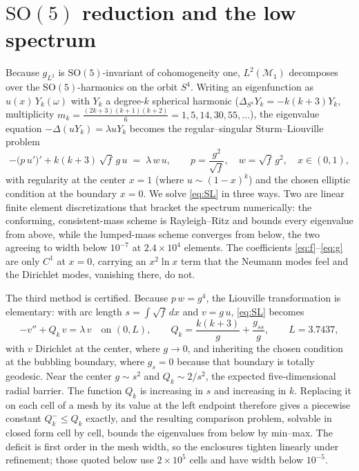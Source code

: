 \documentclass[11pt,letterpaper]{article}
\newcommand{\cM}{\mathcal{M}}
\newcommand{\Lap}{\Delta}
\newcommand{\SO}{\mathrm{SO}}
\theoremstyle{plain}
\theoremstyle{remark}
\begin{document}
\section{$\SO(5)$ reduction and the low spectrum}\label{sec:reduction}

Because $g_{L^2}$ is $\SO(5)$-invariant of cohomogeneity one, $L^2(\cM_1)$ decomposes over the $\SO(5)$-harmonics on the orbit $S^4$. Writing an eigenfunction as $u(x)\,Y_k(\omega)$ with $Y_k$ a degree-$k$ spherical harmonic ($\Lap_{S^4}Y_k=-k(k+3)Y_k$, multiplicity $m_k=\tfrac{(2k+3)(k+1)(k+2)}{6}=1,5,14,30,55,\dots$), the eigenvalue equation $-\Lap(uY_k)=\lambda u Y_k$ becomes the regular--singular Sturm--Liouville problem
\begin{equation}\label{eq:SL}
  -\big(p\,u'\big)' + k(k+3)\,\sqrt{f}\,g\,u \;=\; \lambda\,w\,u,
  \qquad p=\frac{g^2}{\sqrt f},\quad w=\sqrt{f}\,g^2,\quad x\in(0,1),
\end{equation}
with regularity at the center $x=1$ (where $u\sim(1-x)^k$) and the chosen elliptic condition at the boundary $x=0$. We solve \eqref{eq:SL} in three ways. Two are linear finite element discretizations that bracket the spectrum numerically: the conforming, consistent-mass scheme is Rayleigh--Ritz and bounds every eigenvalue from above, while the lumped-mass scheme converges from below, the two agreeing to width below $10^{-7}$ at $2.4\times10^4$ elements. The coefficients \eqref{eq:f}--\eqref{eq:g} are only $C^1$ at $x=0$, carrying an $x^2\ln x$ term that the Neumann modes feel and the Dirichlet modes, vanishing there, do not.

The third method is certified. Because $p\,w=g^4$, the Liouville transformation is elementary: with arc length $s=\int\sqrt f\,dx$ and $v=g\,u$, \eqref{eq:SL} becomes
\begin{equation}\label{eq:schrod}
  -v'' + Q_k\,v = \lambda\,v \quad\text{on }(0,L),\qquad
  Q_k = \frac{k(k+3)}{g} + \frac{g_{ss}}{g},\qquad L=3.7437,
\end{equation}
with $v$ Dirichlet at the center, where $g\to0$, and inheriting the chosen condition at the bubbling boundary, where $g_s=0$ because that boundary is totally geodesic. Near the center $g\sim s^2$ and $Q_k\sim 2/s^2$, the expected five-dimensional radial barrier. The function $Q_k$ is increasing in $s$ and increasing in $k$. Replacing it on each cell of a mesh by its value at the left endpoint therefore gives a piecewise constant $Q_k^-\le Q_k$ exactly, and the resulting comparison problem, solvable in closed form cell by cell, bounds the eigenvalues from below by min--max. The deficit is first order in the mesh width, so the enclosures tighten linearly under refinement; those quoted below use $2\times10^5$ cells and have width below $10^{-5}$.
\end{document}
